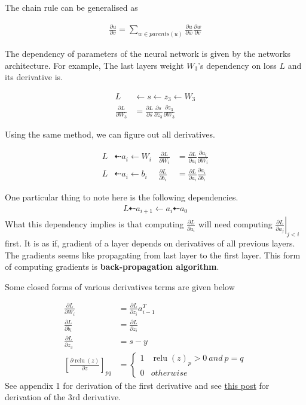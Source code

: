 \documentclass[10pt]{article}
\begin{document}
The chain rule can be generalised as

$$ \begin{aligned}
 \frac{\partial u}{\partial v} = \sum_{w\in parents(u)}\frac{\partial u}{\partial w}\frac{\partial w}{\partial v}
\end{aligned} $$

The dependency of parameters of the neural network is given by the networks architecture. For example, The last layers weight $W_3$'s dependency on loss $L$ and its derivative is. 

$$ \begin{aligned}
 L &\leftarrow s \leftarrow z_3 \leftarrow W_3
 \\
 \frac{\partial L}{\partial W_3} &= \frac{\partial L}{\partial s} \frac{\partial s}{\partial z_3} \frac{\partial z_3}{\partial W_3}
\end{aligned} $$

Using the same method, we can figure out all derivatives. 

$$ \begin{aligned}
 L & \dashleftarrow a_i \leftarrow W_i & 
 \frac{\partial L}{\partial W_i} &= \frac{\partial L}{\partial a_i} \frac{\partial a_i}{\partial W_i}
 \\
 L & \dashleftarrow a_i \leftarrow b_i &
 \frac{\partial L}{\partial b_i} &= \frac{\partial L}{\partial a_i} \frac{\partial a_i}{\partial b_i}
\end{aligned} $$


One particular thing to note here is the following dependencies.
$$ \begin{aligned}
 L \dashleftarrow a_{i+1} \leftarrow a_i  \dashleftarrow a_0
\end{aligned} $$
What this dependency implies is that computing $\frac{\partial L}{\partial a_i}$ will need computing $\left.\frac{\partial L}{\partial a_j}\right|_{j<i}$ first. It is as if, gradient of a layer depends on derivatives of all previous layers.  The gradients seems like propagating from last layer to the first layer. This form of computing gradients is \textbf{back-propagation algorithm}. 

Some closed forms of various derivatives terms are given below


$$ \begin{aligned}
\frac{\partial L}{\partial W_i} &= \frac{\partial L}{\partial z_i} a_{i-1}^T
\\ 
\frac{\partial L}{\partial b_i} &= \frac{\partial L}{\partial z_i}
\\ 
\frac{\partial L}{\partial z_3} &= s-y 
\\ 
\left[\frac{\partial \operatorname{relu}(z)}{\partial z}\right]_{pq} &=  \begin{cases} 1 &\operatorname{relu}(z)_p > 0~and~p=q\\ 0 & otherwise \end{cases}
\end{aligned} $$
See appendix 1 for derivation of the first derivative and see \href{http://everythingproject.in/2018/05/10/softmax-classfier-from-scratch/}{this post} for derivation of the 3rd derivative.
\end{document}
